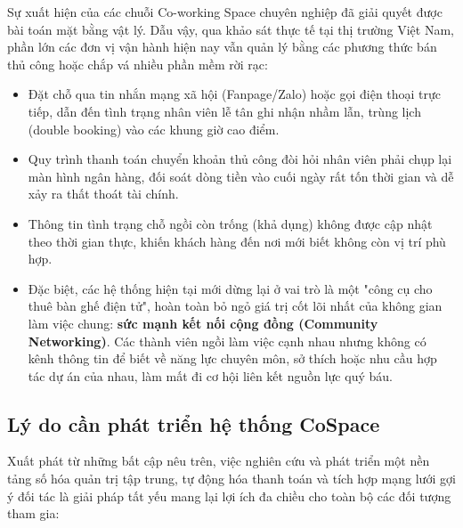 Sự xuất hiện của các chuỗi Co-working Space chuyên nghiệp đã giải quyết được bài toán mặt bằng vật lý. Dẫu vậy, qua khảo sát thực tế tại thị trường Việt Nam, phần lớn các đơn vị vận hành hiện nay vẫn quản lý bằng các phương thức bán thủ công hoặc chắp vá nhiều phần mềm rời rạc:
\begin{itemize}
    \item Đặt chỗ qua tin nhắn mạng xã hội (Fanpage/Zalo) hoặc gọi điện thoại trực tiếp, dẫn đến tình trạng nhân viên lễ tân ghi nhận nhầm lẫn, trùng lịch (double booking) vào các khung giờ cao điểm.
    \item Quy trình thanh toán chuyển khoản thủ công đòi hỏi nhân viên phải chụp lại màn hình ngân hàng, đối soát dòng tiền vào cuối ngày rất tốn thời gian và dễ xảy ra thất thoát tài chính.
    \item Thông tin tình trạng chỗ ngồi còn trống (khả dụng) không được cập nhật theo thời gian thực, khiến khách hàng đến nơi mới biết không còn vị trí phù hợp.
    \item Đặc biệt, các hệ thống hiện tại mới dừng lại ở vai trò là một "công cụ cho thuê bàn ghế điện tử", hoàn toàn bỏ ngỏ giá trị cốt lõi nhất của không gian làm việc chung: \textbf{sức mạnh kết nối cộng đồng (Community Networking)}. Các thành viên ngồi làm việc cạnh nhau nhưng không có kênh thông tin để biết về năng lực chuyên môn, sở thích hoặc nhu cầu hợp tác dự án của nhau, làm mất đi cơ hội liên kết nguồn lực quý báu.
\end{itemize}

\subsection{Lý do cần phát triển hệ thống CoSpace}

Xuất phát từ những bất cập nêu trên, việc nghiên cứu và phát triển một nền tảng số hóa quản trị tập trung, tự động hóa thanh toán và tích hợp mạng lưới gợi ý đối tác là giải pháp tất yếu mang lại lợi ích đa chiều cho toàn bộ các đối tượng tham gia:

